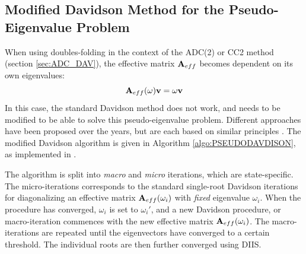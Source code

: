 \subsection{Modified Davidson Method for the Pseudo-Eigenvalue Problem}

When using doubles-folding in the context of the ADC(2) or CC2 method (section \ref{sec:ADC_DAV}), the effective matrix $\mathbf{A}_{eff}$ becomes dependent on its own eigenvalues:
\begin{equation}
\mathbf{A}_{eff}(\omega) \mathbf{v} = \omega \mathbf{v}
\end{equation}
\noindent In this case, the standard Davidson method does not work, and needs to be modified to be able to solve this pseudo-eigenvalue problem. Different approaches have been proposed over the years, but are each based on similar principles \cite{Kat2009,Win2011}. The modified Davidson algorithm is given in Algorithm \ref{algo:PSEUDODAVDISON}, as implemented in \mchem{}. 

The algorithm is split into \emph{macro} and \emph{micro} iterations, which are state-specific. The micro-iterations corresponds to the standard single-root Davidson iterations for diagonalizing an effective matrix $\mathbf{A}_{eff}(\omega_i)$ with \emph{fixed} eigenvalue $\omega_i$. When the procedure has converged, $\omega_i$ is set to $\omega_i'$, and a new Davidson procedure, or macro-iteration commences with the new effective matrix $\mathbf{A}_{eff}(\omega_i)$. The macro-iterations are repeated until the eigenvectors have converged to a certain threshold. The individual roots are then further converged using DIIS.

